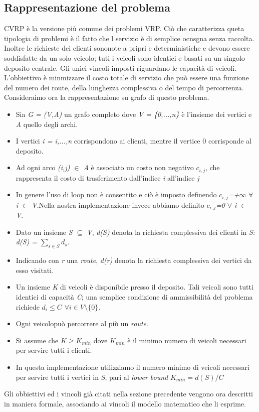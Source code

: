 \documentclass[]{article}
\begin{document}
\newpage
\subsection{Rappresentazione del problema}
CVRP è la versione più comune dei problemi VRP. Ciò che caratterizza queta tipologia di problemi è il fatto che l servizio è di semplice ocnsgna senza raccolta.
Inoltre le richieste dei clienti sononote a pripri e deterministiche e devono essere soddisfatte da un solo veicolo; tuti i veicoli sono identici e basati su un singolo deposito centrale. Gli unici vincoli imposti riguardano le capacità di veicoli. L'obbiettivo è minmizzare il costo totale di servizio che può essere una funzione del numero dei route, della lunghezza complessiva o del tempo di percorrenza.
Consideraimo ora la rappresentazione su grafo di questo problema.
\begin{itemize}
\item Sia \emph{G = (V,A)} un grafo completo dove \emph{V = \{0,...,n\}} è l'insieme dei vertici e \emph{A} quello degli archi.
\item I vertici \emph{i = i,...,n} corrispondono ai clienti, mentre il vertice 0 corrisponde al deposito. 
\item Ad ogni arco \emph{(i,j) $\in$ A} è associato un costo non negativo \emph{$c_{i,j}$}, che rappresenta il costo di trasferimento dall'indice \emph{i} all'indice \emph{j}
\item In genere l'uso di loop non è consentito e ciò è imposto definendo \emph{$c_{i,j}$=+$\infty$}  \emph{ $\forall$ i $\in$ V}.Nella nostra implementazione invece abbiamo definito  \emph{$c_{i,j}$=0}  \emph{ $\forall$ i $\in$ V}.
\item Dato un insieme \emph{ S $\subseteq$ V}, \emph{d(S)} denota la richiesta complessiva dei clienti in \emph{S: d(S) = $\sum_{s \in S} d_{s} $}.
\item  Indicando con \emph{r} una \emph{route}, \emph{d(r)} denota la richiesta complessiva dei vertici da esso visitati.
\item Un insieme \emph{K} di veicoli è disponibile presso il deposito. Tali veicoli sono tutti identici di capacità \emph{C}; una semplice condizione di ammissibilità del problema richiede \emph{$ d_{i} \leq C $ $ \forall i \in V \setminus \{0\} $}.
\item Ogni veicolopuò percorrere al più un \emph{route}.
\item Si assume che \emph{$K \geq K_{min}$} dove \emph{$K_{min}$} è il minimo numero di veicoli necessari per servire tutti i clienti.
\item In questa implementazione utilizziamo il numero minimo di veicoli necessari per servire tutti i vertici in \emph{S}, pari al  \emph{lower bound}  \emph{$ K_{min} =d(S)/C $}
\end{itemize}
Gli obbiettivi ed i vincoli già citati nella sezione precedente vengono ora descritti in maniera formale, associando ai vincoli il modello matematico che li esprime.
\end{document}
